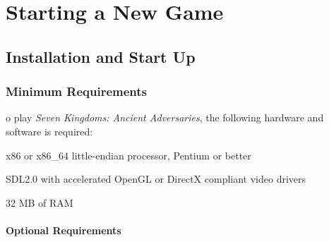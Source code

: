 
\chapter{Starting a New Game}


\section{Installation and Start Up}


\subsection{Minimum Requirements}


o play \textit{Seven Kingdoms: Ancient Adversaries}, the following hardware and software is required:

\begin{changemargin}{0.5cm}{0cm} 
x86 or x86\_64 little-endian processor, Pentium or better

SDL2.0 with accelerated OpenGL or DirectX compliant video drivers

32 MB of RAM
\end{changemargin}

\subsubsection{Optional Requirements}

